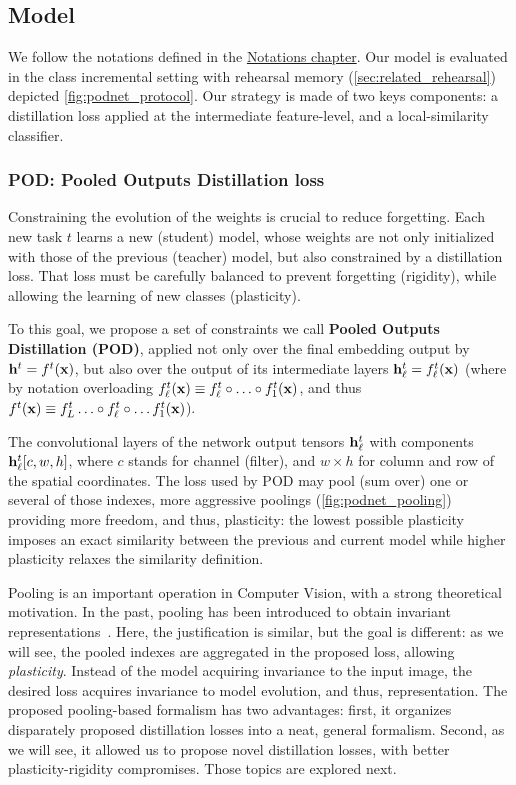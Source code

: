 \subsection{Model}
\label{sec:podnet_model}

We follow the notations defined in the \hyperref[chap:notations]{Notations chapter}. Our model is
evaluated in the class incremental setting with rehearsal memory (\autoref{sec:related_rehearsal})
depicted \autoref{fig:podnet_protocol}. Our strategy is made of two keys components: a distillation
loss applied at the intermediate feature-level, and a local-similarity classifier.

\subsubsection{POD: Pooled Outputs Distillation loss}
\label{sec:podnet_pod}

Constraining the evolution of the weights is crucial to reduce forgetting. Each new task $t$ learns
a new (student) model, whose weights are not only initialized with those of the previous (teacher)
model, but also constrained by a distillation loss. That loss must be carefully balanced to prevent
forgetting (rigidity), while allowing the learning of new classes (plasticity).

To this goal, we propose a set of constraints we call \textbf{Pooled Outputs Distillation (POD)},
applied not only over the final embedding output by $\mathbf{h}^{t}=f^{t}(\mathbf{x})$, but also over the output
of its intermediate layers $\mathbf{h}^{t}_\ell=f^{t}_\ell(\mathbf{x})$ (where by notation overloading
$f^{t}_\ell(\mathbf{x})\equiv f^{t}_\ell\circ\ldots\circ f^{t}_1(\mathbf{x})$, and thus $f^{t}(\mathbf{x})\equiv
    f^{t}_L\ldots\circ f^{t}_\ell\circ\ldots f^{t}_1(\mathbf{x})$).

The convolutional layers of the network output tensors $\mathbf{h}^{t}_{\ell}$ with components
$\mathbf{h}^{t}_\ell[c,w,h]$, where $c$ stands for channel (filter), and $w\times h$ for column and row of
the spatial coordinates. The loss used by POD may pool (sum over) one or several of those indexes,
more aggressive poolings (\autoref{fig:podnet_pooling}) providing more freedom, and thus,
plasticity: the lowest possible plasticity imposes an exact similarity between the previous and
current model while higher plasticity relaxes the similarity definition.

Pooling is an important operation in Computer Vision, with a strong theoretical motivation. In the
past, pooling has been introduced to obtain invariant
representations~\citep{lowe1999sift,lazbnik2006spatial_pyramid_matching}. Here, the justification is
similar, but the goal is different: as we will see, the pooled indexes are aggregated in the
proposed loss, allowing \textit{plasticity}. Instead of the model acquiring invariance to the input
image, the desired loss acquires invariance to model evolution, and thus, representation.
%
The proposed pooling-based formalism has two advantages: first, it organizes disparately proposed
distillation losses into a neat, general formalism. Second, as we will see, it allowed us to propose
novel distillation losses, with better plasticity-rigidity compromises. Those topics are explored
next.


